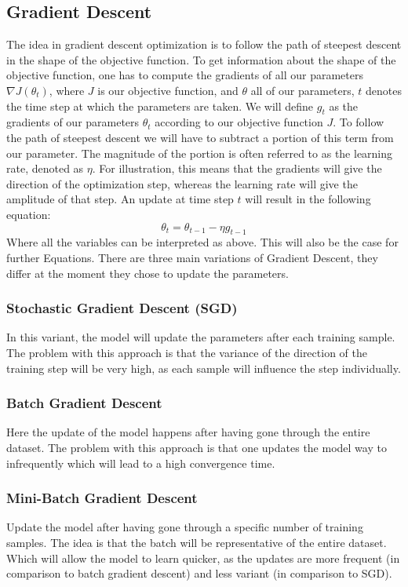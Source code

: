 \subsection{Gradient Descent}
The idea in gradient descent optimization is to follow the path of steepest descent in the shape of the objective function. To get information about the shape of the objective function, one has to compute the gradients of all our parameters   $\nabla J(\theta_{t})$, where $J$ is our objective function, and $\theta$ all of our parameters, $t$ denotes the time step at which the parameters are taken. We will define $g_{t}$ as the gradients of our parameters $\theta_t$ according to our objective function $J$. To follow the path of steepest descent we will have to subtract a portion of this term from our parameter. The magnitude of the portion is often referred to as the learning rate, denoted as $\eta$. For illustration, this means that the gradients will give the direction of the optimization step, whereas the learning rate will give the amplitude of that step. An update at time step $t$ will result in the following equation:
\begin{equation}
\theta_t = \theta_{t-1} - \eta g_{t-1}
\end{equation}
Where all the variables can be interpreted as above. This will also be the case for further Equations. 
There are three main variations of Gradient Descent, they differ at the moment they chose to update the parameters.
\subsubsection{Stochastic Gradient Descent (SGD)} 
In this variant, the model will update the parameters after each training sample. The problem with this approach is that the variance of the direction of the training step will be very high, as each sample will influence the step individually.

\subsubsection{Batch Gradient Descent} 
Here the update of the model happens after having gone through the entire dataset. The problem with this approach is that one updates the model way to infrequently which will lead to a high convergence time.
\subsubsection{Mini-Batch Gradient Descent} 
Update the model after having gone through a specific number of training samples. The idea is that the batch will be representative of the entire dataset. Which will allow the model to learn quicker, as the updates are more frequent (in comparison to batch gradient descent) and less variant (in comparison to SGD).

